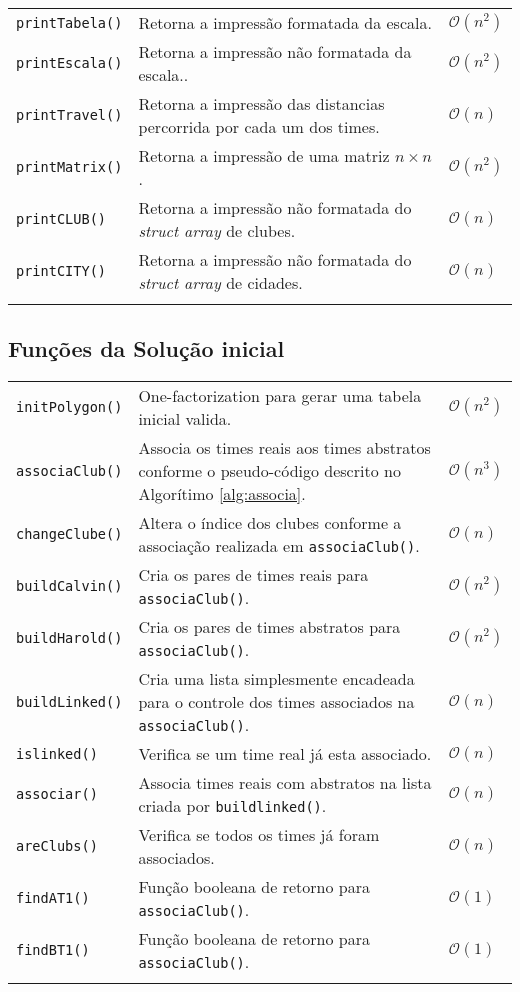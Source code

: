 \documentclass[12pt,a4paper]{article}
\numberwithin{figure}{section}
\numberwithin{table}{section}
\begin{document}
\begin{longtable}{p{3cm} p{11cm} p{1cm}}
	\texttt{printTabela()} & Retorna a impressão formatada da escala. & $\mathcal{O}(n^2)$ \\
	\texttt{printEscala()} & Retorna a impressão não formatada da escala.. & $\mathcal{O}(n^2)$ \\
	\texttt{printTravel()} & Retorna a impressão das distancias percorrida por cada um dos times. & $\mathcal{O}(n)$ \\
	\texttt{printMatrix()} & Retorna a impressão de uma matriz $n \times n$. & $\mathcal{O}(n^2)$ \\
	\texttt{printCLUB()} & Retorna a impressão não formatada do \textit{struct array} de clubes. & $\mathcal{O}(n)$ \\
	\texttt{printCITY()} & Retorna a impressão não formatada do \textit{struct array} de cidades. & $\mathcal{O}(n)$ \\
	\label{tab:print}
\end{longtable}
\vspace{-0.5cm}

\subsection{Funções da Solução inicial}
	
\begin{longtable}{p{3cm} p{11cm} p{1cm}}
	\texttt{initPolygon()} & One-factorization para gerar uma tabela inicial valida. & $\mathcal{O}(n^2)$ \\
	\texttt{associaClub()} & Associa os times reais aos times abstratos conforme o pseudo-código descrito no Algorítimo \ref{alg:associa}. & $\mathcal{O}(n^3)$ \\
	\texttt{changeClube()} & Altera o índice dos clubes conforme a associação realizada em \texttt{associaClub()}. & $\mathcal{O}(n)$ \\
	\texttt{buildCalvin()} & Cria os pares de times reais para \texttt{associaClub()}. & $\mathcal{O}(n^2)$ \\
	\texttt{buildHarold()} & Cria os pares de times abstratos para \texttt{associaClub()}. & $\mathcal{O}(n^2)$ \\
	\texttt{buildLinked()} & Cria uma lista simplesmente encadeada para o controle dos times associados na \texttt{associaClub()}. & $\mathcal{O}(n)$ \\
	\texttt{islinked()} & Verifica se um time real já esta associado. & $\mathcal{O}(n)$ \\
	\texttt{associar()} & Associa times reais com abstratos na lista criada por \texttt{buildlinked()}. & $\mathcal{O}(n)$ \\
	\texttt{areClubs()} & Verifica se todos os times já foram associados. & $\mathcal{O}(n)$ \\
	\texttt{findAT1()} & Função booleana de retorno para \texttt{associaClub()}. & $\mathcal{O}(1)$ \\
	\texttt{findBT1()} & Função booleana de retorno para \texttt{associaClub()}. & $\mathcal{O}(1)$ \\
	\label{tab:s0}
\end{longtable}
\vspace{-0.5cm}
\end{document}
